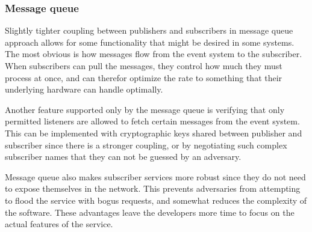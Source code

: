 \documentclass[conference]{IEEEtran}
\begin{document}
\subsubsection{Message queue}
Slightly tighter coupling between publishers and subscribers in message queue approach allows for some functionality that might be desired in some systems. The most obvious is how messages flow from the event system to the subscriber. When subscribers can pull the messages, they control how much they must process at once, and can therefor optimize the rate to something that their underlying hardware can handle optimally.

Another feature supported only by the message queue is verifying that only permitted listeners are allowed to fetch certain messages from the event system. This can be implemented with cryptographic keys shared between publisher and subscriber since there is a stronger coupling, or by negotiating such complex subscriber names that they can not be guessed by an adversary.

Message queue also makes subscriber services more robust since they do not need to expose themselves in the network. This prevents adversaries from attempting to flood the service with bogus requests, and somewhat reduces the complexity of the software. These advantages leave the developers more time to focus on the actual features of the service.
\\
\end{document}

